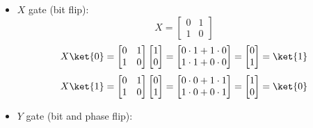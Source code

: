 \begin{itemize}
\begin{equation*}
\begin{bmatrix}
        \end{bmatrix} =
        -\ket{1}
    \end{equation*}
    \item $X$ gate (bit flip):
    \begin{equation*}
        X = \begin{bmatrix}
            0 & 1 \\
            1 & 0
        \end{bmatrix}
    \end{equation*}
    \begin{equation*}
        X \ket{0} = \begin{bmatrix}
            0 & 1 \\
            1 & 0
        \end{bmatrix} \begin{bmatrix}
            1 \\ 0
        \end{bmatrix} =
        \begin{bmatrix}
            0 \cdot 1 + 1 \cdot 0 \\
            1 \cdot 1 + 0 \cdot 0
        \end{bmatrix} =
        \begin{bmatrix}
            0 \\ 1
        \end{bmatrix} =
        \ket{1}
    \end{equation*}
    \begin{equation*}
        X \ket{1} = \begin{bmatrix}
            0 & 1 \\
            1 & 0
        \end{bmatrix} \begin{bmatrix}
            0 \\ 1
        \end{bmatrix} =
        \begin{bmatrix}
            0 \cdot 0 + 1 \cdot 1 \\
            1 \cdot 0 + 0 \cdot 1
        \end{bmatrix} =
        \begin{bmatrix}
            1 \\ 0
        \end{bmatrix} =
        \ket{0}
    \end{equation*}
    \item $Y$ gate (bit and phase flip):
    \begin{equation*}

\end{equation*}
\end{itemize}
